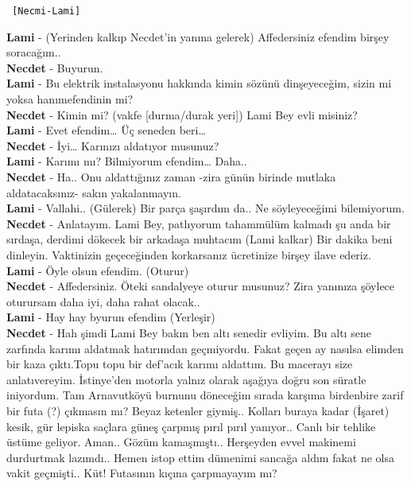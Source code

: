 \documentclass[]{book}
\begin{document}
\begin{verbatim}
 [Necmi-Lami]
\end{verbatim}

\textbf{Lami} - (Yerinden kalkıp Necdet'in yanına gelerek) Affedersiniz efendim birşey soracağım..\\
\textbf{Necdet} - Buyurun.\\
\textbf{Lami} - Bu elektrik instalasyonu hakkında kimin sözünü dinşeyeceğim, sizin mi yoksa hanımefendinin mi?\\
\textbf{Necdet} - Kimin mi? (vakfe {[}durma/durak yeri{]}) Lami Bey evli misiniz?\\
\textbf{Lami} - Evet efendim\ldots{} Üç seneden beri\ldots{}\\
\textbf{Necdet} - İyi\ldots{} Karınızı aldatıyor musunuz?\\
\textbf{Lami} - Karımı mı? Bilmiyorum efendim\ldots{} Daha..\\
\textbf{Necdet} - Ha.. Onu aldattığınız zaman -zira günün birinde mutlaka aldatacaksınız- sakın yakalanmayın.\\
\textbf{Lami} - Vallahi.. (Gülerek) Bir parça şaşırdım da.. Ne söyleyeceğimi bilemiyorum.\\
\textbf{Necdet} - Anlatayım. Lami Bey, patlıyorum tahammülüm kalmadı şu anda bir sırdaşa, derdimi dökecek bir arkadaşa muhtacım (Lami kalkar) Bir dakika beni dinleyin. Vaktinizin geçeceğinden korkarsanız ücretinize birşey ilave ederiz.\\
\textbf{Lami} - Öyle olsun efendim. (Oturur)\\
\textbf{Necdet} - Affedersiniz. Öteki sandalyeye oturur musunuz? Zira yanınıza şöylece oturursam daha iyi, daha rahat olacak..\\
\textbf{Lami} - Hay hay byurun efendim (Yerleşir)\\
\textbf{Necdet} - Hah şimdi Lami Bey bakın ben altı senedir evliyim. Bu altı sene zarfında karımı aldatmak hatırımdan geçmiyordu. Fakat geçen ay nasılsa elimden bir kaza çıktı.Topu topu bir def'acık karımı aldattım. Bu macerayı size anlatıvereyim. İstinye'den motorla yalnız olarak aşağıya doğru son süratle iniyordum. Tam Arnavutköyü burnunu döneceğim sırada karşıma birdenbire zarif bir futa (?) çıkmasın mı? Beyaz ketenler giymiş.. Kolları buraya kadar (İşaret) kesik, gür lepiska saçlara güneş çarpmış pırıl pırıl yanıyor.. Canlı bir tehlike üstüme geliyor. Aman.. Gözüm kamaşmıştı.. Herşeyden evvel makinemi durdurtmak lazımdı.. Hemen istop ettim dümenimi sancağa aldım fakat ne olsa vakit geçmişti.. Küt! Futasının kıçına çarpmayayım mı?\\
\end{document}
